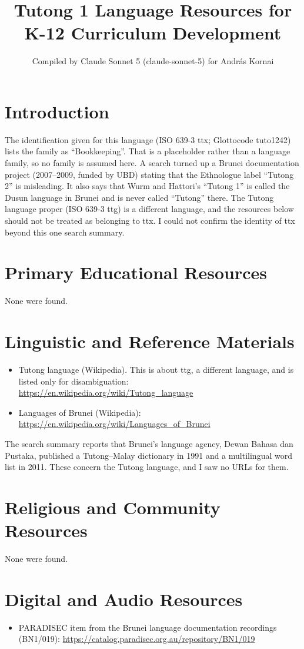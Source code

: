 \documentclass[12pt]{article}
\title{Tutong 1 Language Resources for K-12 Curriculum Development}
\author{Compiled by Claude Sonnet 5 (claude-sonnet-5) for Andr\'as Kornai}
\date{}
\begin{document}
\maketitle

\section{Introduction}
The identification given for this language (ISO 639-3 ttx; Glottocode tuto1242) lists the family as ``Bookkeeping''. That is a placeholder rather than a language family, so no family is assumed here. A search turned up a Brunei documentation project (2007--2009, funded by UBD) stating that the Ethnologue label ``Tutong 2'' is misleading. It also says that Wurm and Hattori's ``Tutong 1'' is called the Dusun language in Brunei and is never called ``Tutong'' there. The Tutong language proper (ISO 639-3 ttg) is a different language, and the resources below should not be treated as belonging to ttx. I could not confirm the identity of ttx beyond this one search summary.

\section{Primary Educational Resources}
None were found.

\section{Linguistic and Reference Materials}
\begin{itemize}
\item Tutong language (Wikipedia). This is about ttg, a different language, and is listed only for disambiguation: \url{https://en.wikipedia.org/wiki/Tutong_language}
\item Languages of Brunei (Wikipedia): \url{https://en.wikipedia.org/wiki/Languages_of_Brunei}
\end{itemize}
The search summary reports that Brunei's language agency, Dewan Bahasa dan Pustaka, published a Tutong--Malay dictionary in 1991 and a multilingual word list in 2011. These concern the Tutong language, and I saw no URLs for them.

\section{Religious and Community Resources}
None were found.

\section{Digital and Audio Resources}
\begin{itemize}
\item PARADISEC item from the Brunei language documentation recordings (BN1/019): \url{https://catalog.paradisec.org.au/repository/BN1/019}
\end{itemize}
\end{document}

